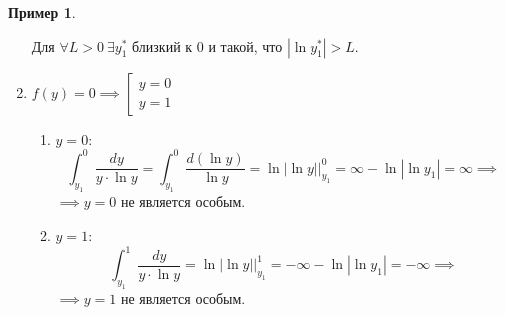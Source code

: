 \documentclass[11pt,a4paper,oneside]{report}
\theoremstyle{definition}
\newtheorem{example}{Пример}
\theoremstyle{plain}
\theoremstyle{remark}
\begin{document}
\begin{example}
\begin{enumerate}
              Для $\forall L > 0 \ \exists y_1^*$ близкий к $0$ и такой, что $|\ln y_1^*| > L$.
        \item $f(y) = 0 \implies \left[\begin{array}{l}
                      y = 0 \\
                      y = 1
                  \end{array}\right.$
              \begin{enumerate}
                  \item $y = 0$:
                        \begin{equation*}
                            \int_{y_1}^{0}\frac{dy}{y \cdot \ln y} = \int_{y_1}^{0}\frac{d(\ln y)}{\ln y} = \ln |\ln y| \Big|_{y_1}^0 = \infty - \ln|\ln y_1| = \infty \implies
                        \end{equation*}
                        $\implies y =0$ не является особым.
                  \item $y = 1$:
                        \begin{equation*}
                            \int_{y_1}^{1}\frac{dy}{y\cdot \ln y} = \ln|\ln y| \Big|_{y_1}^1 = -\infty - \ln|\ln y_1| = - \infty \implies
                        \end{equation*}
                        $\implies y =1$ не является особым.
              \end{enumerate}
    \end{enumerate}
\end{example}
\end{document}
